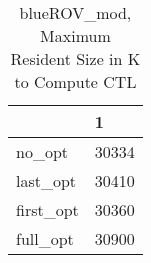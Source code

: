 \begin{table}
\caption{blueROV\_mod, Maximum Resident Size in K to Compute CTL}
\label{blueROV_mod_CTL_size}
\begin{tabular}{ll}
\toprule
 & 1 \\
\midrule
no\_opt & 30334 \\
last\_opt & 30410 \\
first\_opt & 30360 \\
full\_opt & 30900 \\
\bottomrule
\end{tabular}
\end{table}
